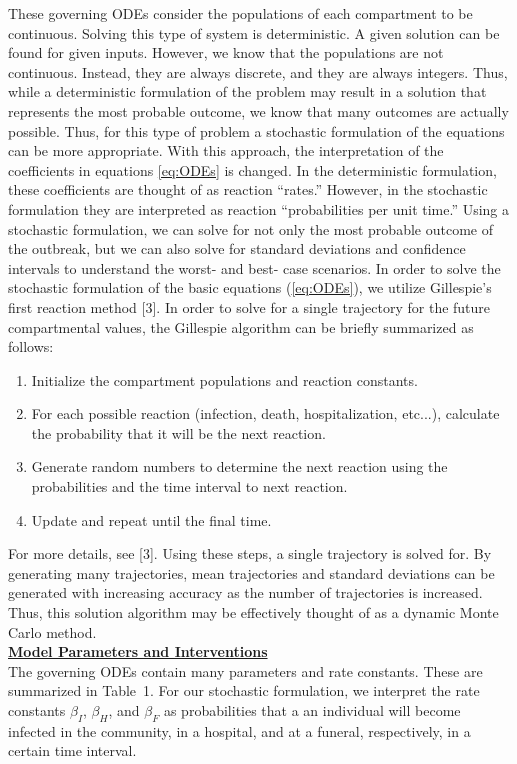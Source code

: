 \documentclass[11pt,letter]{article}
\begin{document}
\vspace{-3mm}These governing ODEs consider the populations of each compartment to be continuous. Solving this type of system is deterministic. A given solution can be found for given inputs. However, we know that the populations are not continuous. Instead, they are always discrete, and they are always integers. Thus, while a deterministic formulation of the problem may result in a solution that represents the most probable outcome, we know that many outcomes are actually possible. Thus, for this type of problem a stochastic formulation of the equations can be more appropriate. With this approach, the interpretation of the coefficients in equations \ref{eq:ODEs} is changed. In the deterministic formulation, these coefficients are thought of as reaction ``rates.'' However, in the stochastic formulation they are interpreted as reaction ``probabilities per unit time.'' Using a stochastic formulation, we can solve for not only the most probable outcome of the outbreak, but we can also solve for standard deviations and confidence intervals to understand the worst- and best- case scenarios. In order to solve the stochastic formulation of the basic equations (\ref{eq:ODEs}), we utilize Gillespie's first reaction method [3]. In order to solve for a single trajectory for the future compartmental values, the Gillespie algorithm can be briefly summarized as follows:
\begin{enumerate}
	\item{Initialize the compartment populations and reaction constants.}
	\item{For each possible reaction (infection, death, hospitalization, etc...), calculate the probability that it will be the next reaction.}
	\item{Generate random numbers to determine the next reaction using the probabilities and the time interval to next reaction.}
	\item{Update and repeat until the final time.}
\end{enumerate}
For more details, see [3]. Using these steps, a single trajectory is solved for. By generating many trajectories, mean trajectories and standard deviations can be generated with increasing accuracy as the number of trajectories is increased. Thus, this solution algorithm may be effectively thought of as a dynamic Monte Carlo method.\\

\underline{\textbf{Model Parameters and Interventions}}\vspace{0.5mm}\\
The governing ODEs contain many parameters and rate constants. These are summarized in Table~1. For our stochastic formulation, we interpret the rate constants $\beta_I$, $\beta_H$, and $\beta_F$ as probabilities that a an individual will become infected in the community, in a hospital, and at a funeral, respectively, in a certain time interval.
\end{document}
